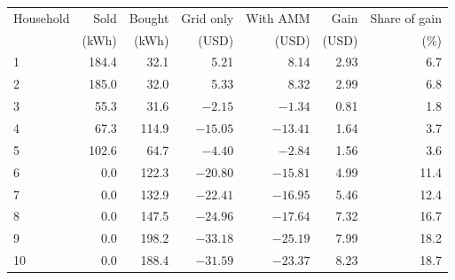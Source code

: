\begin{tabular}{lrrrrrr}
\toprule
Household & Sold & Bought & Grid only & With AMM & Gain & Share of gain \\
 & (kWh) & (kWh) & (USD) & (USD) & (USD) & (\%) \\
\midrule
1 & 184.4 & 32.1 & 5.21 & 8.14 & 2.93 & 6.7 \\
2 & 185.0 & 32.0 & 5.33 & 8.32 & 2.99 & 6.8 \\
3 & 55.3 & 31.6 & $-2.15$ & $-1.34$ & 0.81 & 1.8 \\
4 & 67.3 & 114.9 & $-15.05$ & $-13.41$ & 1.64 & 3.7 \\
5 & 102.6 & 64.7 & $-4.40$ & $-2.84$ & 1.56 & 3.6 \\
6 & 0.0 & 122.3 & $-20.80$ & $-15.81$ & 4.99 & 11.4 \\
7 & 0.0 & 132.9 & $-22.41$ & $-16.95$ & 5.46 & 12.4 \\
8 & 0.0 & 147.5 & $-24.96$ & $-17.64$ & 7.32 & 16.7 \\
9 & 0.0 & 198.2 & $-33.18$ & $-25.19$ & 7.99 & 18.2 \\
10 & 0.0 & 188.4 & $-31.59$ & $-23.37$ & 8.23 & 18.7 \\
\bottomrule
\end{tabular}